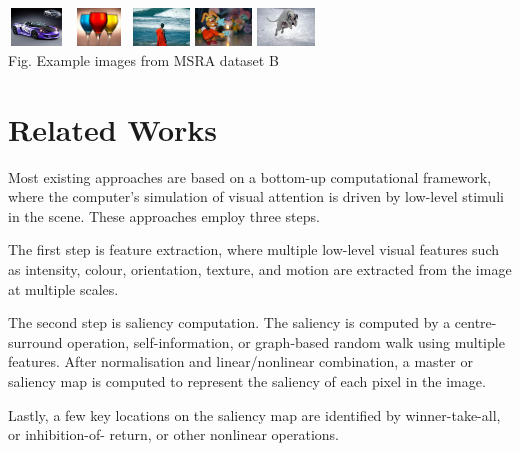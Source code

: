 \documentclass[10pt,twocolumn,letterpaper]{article}
\begin{document}
\begin{center}
    \includegraphics[width=0.6in,height=0.4in]{./Figures/example_image/4_142_142916.jpg}
    \includegraphics[width=0.6in,height=0.4in]{./Figures/example_image/4_143_143262.jpg}
    \includegraphics[width=0.6in,height=0.4in]{./Figures/example_image/4_144_144604.jpg}
    \includegraphics[width=0.6in,height=0.4in]{./Figures/example_image/4_134_134777.jpg}
    \includegraphics[width=0.6in,height=0.4in]{./Figures/example_image/4_134_134664.jpg}\\
    \footnotesize Fig. Example images from MSRA dataset B
    \end{center}

\section{Related Works}
Most existing approaches are based on a bottom-up computational framework, where the computer's simulation of visual attention is driven by low-level stimuli in the scene.  %
These approaches employ three steps.

The first step is feature extraction, where multiple low-level visual features such as intensity, colour, orientation, texture, and motion are extracted from the image at multiple scales.

The second step is saliency computation. The saliency is computed by a centre-surround operation, self-information, or graph-based random walk using multiple features. After normalisation and linear/nonlinear combination, a master or saliency map is computed to represent the saliency of each pixel in the image. 

Lastly, a few key locations on the saliency map are identified by winner-take-all, or inhibition-of- return, or other nonlinear operations.
\end{document}
